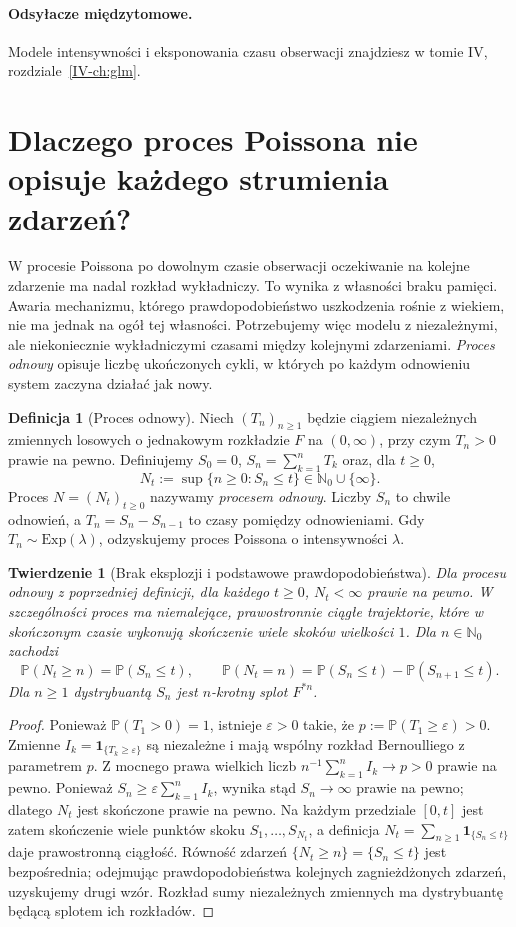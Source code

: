 \documentclass[11pt,a4paper,oneside]{report}
\numberwithin{equation}{chapter}
\theoremstyle{plain}
\newtheorem{twierdzenie}{Twierdzenie}[chapter]
\theoremstyle{definition}
\newtheorem{definicja}{Definicja}[chapter]
\theoremstyle{remark}
\newcommand{\N}{\mathbb{N}}
\newcommand{\Prob}{\mathbb{P}}
\newcommand{\ind}[1]{\mathbf{1}_{#1}}
\begin{document}
\paragraph{Odsyłacze międzytomowe.} Modele intensywności i eksponowania czasu obserwacji znajdziesz w tomie IV, rozdziale~\ref{IV-ch:glm}.


\section{Dlaczego proces Poissona nie opisuje każdego strumienia zdarzeń?}
W procesie Poissona po dowolnym czasie obserwacji oczekiwanie na
kolejne zdarzenie ma nadal rozkład wykładniczy. To wynika z własności
braku pamięci. Awaria mechanizmu, którego prawdopodobieństwo
uszkodzenia rośnie z wiekiem, nie ma jednak na ogół tej własności.
Potrzebujemy więc modelu z niezależnymi, ale niekoniecznie
wykładniczymi czasami między kolejnymi zdarzeniami.
\emph{Proces odnowy} opisuje liczbę ukończonych cykli, w których
po każdym odnowieniu system zaczyna działać jak nowy.

\begin{definicja}[Proces odnowy]
Niech $(T_n)_{n\ge1}$ będzie ciągiem niezależnych zmiennych
losowych o jednakowym rozkładzie $F$ na $(0,\infty)$, przy czym
$T_n>0$ prawie na pewno. Definiujemy $S_0=0$,
$S_n=\sum_{k=1}^nT_k$ oraz, dla $t\ge0$,
\[
N_t:=\sup\{n\ge0:S_n\le t\}\in\N_0\cup\{\infty\}.
\]
Proces $N=(N_t)_{t\ge0}$ nazywamy \emph{procesem odnowy}.
Liczby $S_n$ to chwile odnowień, a $T_n=S_n-S_{n-1}$
to czasy pomiędzy odnowieniami. Gdy $T_n\sim\mathrm{Exp}(\lambda)$,
odzyskujemy proces Poissona o intensywności $\lambda$.
\end{definicja}

\begin{twierdzenie}[Brak eksplozji i podstawowe prawdopodobieństwa]
Dla procesu odnowy z poprzedniej definicji, dla każdego $t\ge0$,
$N_t<\infty$ prawie na pewno. W szczególności proces ma
niemalejące, prawostronnie ciągłe trajektorie, które w skończonym
czasie wykonują skończenie wiele skoków wielkości $1$.
Dla $n\in\N_0$ zachodzi
\[
\Prob(N_t\ge n)=\Prob(S_n\le t),\qquad
\Prob(N_t=n)=\Prob(S_n\le t)-\Prob(S_{n+1}\le t).
\]
Dla $n\ge1$ dystrybuantą $S_n$ jest $n$-krotny splot $F^{*n}$.
\end{twierdzenie}
\begin{proof}
Ponieważ $\Prob(T_1>0)=1$, istnieje $\varepsilon>0$
takie, że $p:=\Prob(T_1\ge\varepsilon)>0$.
Zmienne $I_k=\ind{\{T_k\ge\varepsilon\}}$ są niezależne
i mają wspólny rozkład Bernoulliego z parametrem $p$.
Z mocnego prawa wielkich liczb
$n^{-1}\sum_{k=1}^n I_k\to p>0$ prawie na pewno.
Ponieważ $S_n\ge\varepsilon\sum_{k=1}^nI_k$, wynika stąd
$S_n\to\infty$ prawie na pewno; dlatego $N_t$ jest skończone
prawie na pewno. Na każdym przedziale $[0,t]$ jest zatem
skończenie wiele punktów skoku $S_1,\dots,S_{N_t}$,
a definicja $N_t=\sum_{n\ge1}\ind{\{S_n\le t\}}$
daje prawostronną ciągłość.
Równość zdarzeń $\{N_t\ge n\}=\{S_n\le t\}$ jest bezpośrednia;
odejmując prawdopodobieństwa kolejnych zagnieżdżonych zdarzeń,
uzyskujemy drugi wzór. Rozkład sumy niezależnych zmiennych
ma dystrybuantę będącą splotem ich rozkładów.
\end{proof}
\end{document}
